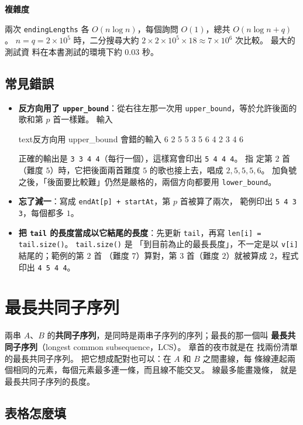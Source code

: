 \textbf{複雜度}

兩次 \texttt{endingLengths} 各 $O(n \log n)$，每個詢問 $O(1)$，總共
$O(n \log n + q)$。 $n = q = 2 \times 10^5$ 時，二分搜尋大約
$2 \times 2 \times 10^5 \times 18 \approx 7 \times 10^6$ 次比較。 最大的測試資
料在本書測試的環境下約 $0.03$ 秒。

\subsection{常見錯誤}

\begin{itemize}
\item \textbf{反方向用了 \texttt{upper\_bound}}：從右往左那一次用
\texttt{upper\_bound}，等於允許後面的歌和第 $p$ 首一樣難。 輸入
\begin{code}{text}{反方向用 upper\_bound 會錯的輸入}
6
2 5 5 3 5 6
4
2 3 4 6
\end{code}
正確的輸出是 \texttt{3 3 4 4}（每行一個），這樣寫會印出 \texttt{5 4 4 4}。 指
定第 $2$ 首（難度 $5$）時，它把後面兩首難度 $5$ 的歌也接上去，唱成
$2, 5, 5, 5, 6$。 加負號之後，「後面要比較難」仍然是嚴格的，兩個方向都要用
\texttt{lower\_bound}。
\item \textbf{忘了減一}：寫成 \texttt{endAt[p] + startAt}，第 $p$ 首被算了兩次，
範例印出 \texttt{5 4 3 3}，每個都多 $1$。
\item \textbf{把 \texttt{tail} 的長度當成以它結尾的長度}：先更新
\texttt{tail}，再寫 \texttt{len[i] = tail.size()}。 \texttt{tail.size()} 是
「到目前為止的最長長度」，不一定是以 \texttt{v[i]} 結尾的；範例的第 $2$ 首
（難度 $7$）算對，第 $3$ 首（難度 $2$）就被算成 $2$，程式印出
\texttt{4 5 4 4}。
\end{itemize}

\section{最長共同子序列}
\label{sec:ss-lcs}

兩串 $A$、$B$ 的\textbf{共同子序列}，是同時是兩串子序列的序列；最長的那一個叫
\textbf{最長共同子序列}（longest common subsequence，LCS）。 章首的夜市就是在
找兩份清單的最長共同子序列。 把它想成配對也可以：在 $A$ 和 $B$ 之間畫線，每
條線連起兩個相同的元素，每個元素最多連一條，而且線不能交叉。 線最多能畫幾條，
就是最長共同子序列的長度。

\subsection{表格怎麼填}
\label{sec:ss-lcs-table}

